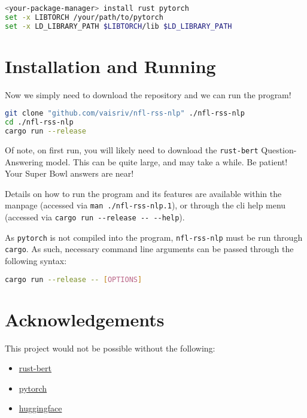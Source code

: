 \begin{lstlisting}[language=bash]
<your-package-manager> install rust pytorch
set -x LIBTORCH /your/path/to/pytorch
set -x LD_LIBRARY_PATH $LIBTORCH/lib $LD_LIBRARY_PATH
\end{lstlisting}

\section{Installation and Running}
Now we simply need to download the repository and we can run the program!

\begin{lstlisting}[language=bash]
git clone "github.com/vaisriv/nfl-rss-nlp" ./nfl-rss-nlp
cd ./nfl-rss-nlp
cargo run --release
\end{lstlisting}

Of note, on first run, you will likely need to download the \lstinline{rust-bert} Question-Answering model. This can be quite large, and may take a while. Be patient! Your Super Bowl answers are near!

Details on how to run the program and its features are available within the manpage (accessed via \lstinline{man ./nfl-rss-nlp.1}), or through the cli help menu (accessed via \lstinline{cargo run --release -- --help}).

As \lstinline{pytorch} is not compiled into the program, \lstinline{nfl-rss-nlp} must be run through \lstinline{cargo}. As such, necessary command line arguments can be passed through the following syntax:
\begin{lstlisting}[language=bash]
cargo run --release -- [OPTIONS]
\end{lstlisting}

\section{Acknowledgements}
This project would not be possible without the following:
\begin{itemize}
    \item \href{https://crates.io/crates/rust_bert}{rust-bert}
    \item \href{https://pytorch.org/}{pytorch}
    \item \href{https://huggingface.co/}{huggingface}
\end{itemize}


